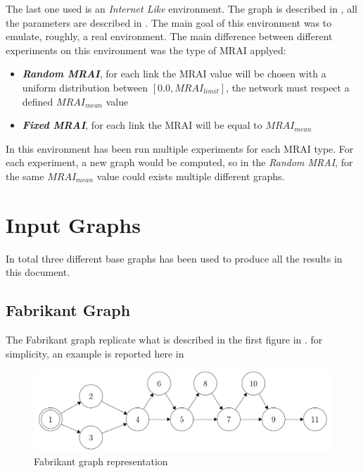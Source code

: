 \documentclass[10pt,conference,letterpaper]{IEEEtran}
\newcommand{\figwidth}{0.78}
\newcommand{\figvspace}{-1.5em}
\begin{document}
The last one used is an \textit{Internet Like} environment. 
The graph is described in , all the parameters are described in
.
The main goal of this environment was to emulate, roughly, a real environment.
The main difference between different experiments on this environment was the
type of \ac{MRAI} applyed:
\begin{itemize}
	\item \textit{\textbf{Random MRAI}}, for each link the \ac{MRAI} value will
		be chosen with a uniform distribution between $[0.0, MRAI_{limit}]$,
		the network must respect a defined $MRAI_{mean}$ value
	\item \textit{\textbf{Fixed MRAI}}, for each link the \ac{MRAI} will be 
		equal to $MRAI_{mean}$
\end{itemize}
In this environment has been run multiple experiments for each \ac{MRAI} type.
For each experiment, a new graph would be computed, so in the \textit{Random MRAI},
for the same $MRAI_{mean}$ value could exists multiple different graphs.

\section{Input Graphs}
\label{sec:graph}

In total three different base graphs has been used to produce all the results
in this document.

\subsection{Fabrikant Graph}
\label{subsec:fabrikant_graph}
The Fabrikant graph replicate what is described in the first figure in \cite{fabrikant}.
for simplicity, an example is reported here in 

\begin{figure}[tb]
	\centering
	\includegraphics[width=\figwidth\columnwidth]{images/fabrikant/graph.jpg}
	\caption{Fabrikant graph representation}
	\label{fig:fabr_graph}
	\vspace{\figvspace}
\end{figure}
\end{document}
